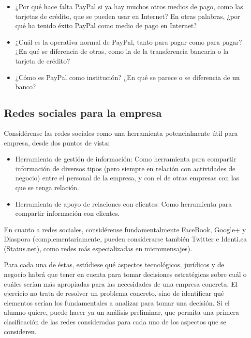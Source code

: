 \documentclass[a4paper,12pt]{article}
\begin{document}
\begin{itemize}
\item ¿Por qué hace falta PayPal si ya hay muchos otros medios de pago, como las tarjetas de crédito, que se pueden usar en Internet? En otras palabras, ¿por qué ha tenido éxito PayPal como medio de pago en Internet?
\item ¿Cuál es la operativa normal de PayPal, tanto para pagar como para pagar? ¿En qué se diferencia de otras, como la de la transferencia bancaria o la tarjeta de crédito?
\item ¿Cómo es PayPal como institución? ¿En qué se parece o se diferencia de un banco?
\end{itemize}


\subsection{Redes sociales para la empresa}
\label{sub:redes-sociales-empresa}

Considérense las redes sociales como una herramienta potencialmente útil para empresa, desde dos puntos de vista:

\begin{itemize}
\item Herramienta de gestión de información: Como herramienta para compartir información de diversos tipos (pero siempre en relación con actividades de negocio) entre el personal de la empresa, y con el de otras empresas con las que se tenga relación.
\item Herramienta de apoyo de relaciones con clientes: Como herramienta para compartir información con clientes.
\end{itemize}

En cuanto a redes sociales, considérense fundamentalmente FaceBook, Google+ y Diaspora (complementariamente, pueden considerarse también Twitter e Identi.ca (Status.net), como redes más especializadas en micromensajes).

Para cada una de éstas, estúdiese qué aspectos tecnológicos, jurídicos y de negocio habrá que tener en cuenta para tomar decisiones estratégicas sobre cuál o cuáles serían más apropiadas para las necesidades de una empresa concreta. El ejercicio no trata de resolver un problema concreto, sino de identificar qué elementos serían los fundamentales a analizar para tomar una decisión. Si el alumno quiere, puede hacer ya un análisis preliminar, que permita una primera clasificación de las redes consideradas para cada uno de los aspectos que se consideren.
\end{document}

